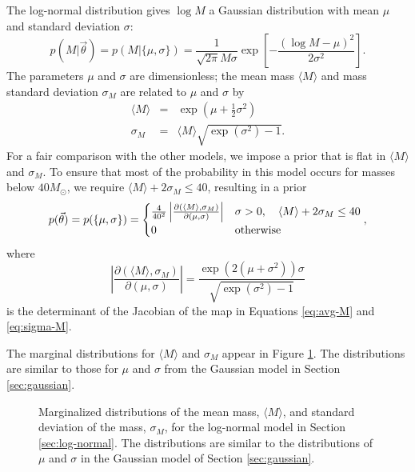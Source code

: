 \documentclass[preprint]{aastex}
\newcommand{\Msun}{M_\odot}
\newcommand{\vtheta}{\vec{\theta}}
\begin{document}
The log-normal distribution gives $\log M$ a Gaussian distribution
with mean $\mu$ and standard deviation $\sigma$:
\begin{equation}
  \label{eq:log-normal-def}
  p(M|\vtheta) = p(M|\{\mu, \sigma \}) = \frac{1}{
    \sqrt{2\pi} M \sigma} \exp\left[ -\frac{\left(\log M - \mu\right)^2}{2 \sigma^2} \right].
\end{equation}
The parameters $\mu$ and $\sigma$ are dimensionless; the mean mass
$\langle M \rangle$ and mass standard deviation $\sigma_M$ are related
to $\mu$ and $\sigma$ by
\begin{eqnarray}
  \label{eq:avg-M}
  \langle M \rangle & = & \exp\left( \mu + \frac{1}{2} \sigma^2
  \right) \\
  \label{eq:sigma-M}
  \sigma_M & = & \langle M \rangle \sqrt{\exp\left( \sigma^2 \right) - 1}.
\end{eqnarray}
For a fair comparison with the other models, we impose a prior that is
flat in $\langle M \rangle$ and $\sigma_M$.  To ensure that most of
the probability in this model occurs for masses below $40 \Msun$, we
require $\langle M \rangle + 2 \sigma_M \leq 40$, resulting in a
prior
\begin{equation}
  p(\vtheta) = p(\{\mu,\sigma\}) = 
  \begin{cases}
    \frac{4}{40^2} \left| \frac{\partial \left(\langle M \rangle,
          \sigma_M \right)}{\partial \left( \mu, \sigma \right)}
    \right| & \sigma > 0, \quad \langle M \rangle + 2 \sigma_M \leq 40
    \\
    0 & \textnormal{otherwise}
  \end{cases},
\end{equation}
where 
\begin{equation}
  \left| \frac{\partial \left(\langle M \rangle,
          \sigma_M \right)}{\partial \left( \mu, \sigma \right)}
    \right| = \frac{\exp\left( 2 \left( \mu + \sigma^2 \right)\right)
      \sigma}{\sqrt{\exp\left( \sigma^2 \right) - 1}}
\end{equation}
is the determinant of the Jacobian of the map in Equations
\eqref{eq:avg-M} and \eqref{eq:sigma-M}.

The marginal distributions for $\langle M \rangle$ and $\sigma_M$
appear in Figure \ref{fig:log-normal}.  The distributions are similar
to those for $\mu$ and $\sigma$ from the Gaussian model in Section
\ref{sec:gaussian}.

\begin{figure}
  \begin{center}
  \end{center}
  \caption{\label{fig:log-normal} Marginalized distributions of the
    mean mass, $\langle M \rangle$, and standard deviation of the
    mass, $\sigma_M$, for the log-normal model in Section
    \ref{sec:log-normal}.  The distributions are similar to the
    distributions of $\mu$ and $\sigma$ in the Gaussian model of
    Section \ref{sec:gaussian}.}
\end{figure}
\end{document}
